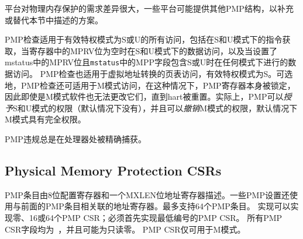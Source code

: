 {\iffalse
\begin{commentary}
Platforms vary widely in demands for physical memory protection, and
some platforms may provide other PMP structures in addition to or
instead of the scheme described in this section.
\end{commentary}
\fi
\begin{commentary}
平台对物理内存保护的需求差异很大，一些平台可能提供其他PMP结构，以补充或替代本节中描述的方案。
\end{commentary}

\iffalse
PMP checks are applied to all accesses whose effective privilege mode is S or
U, including instruction fetches in S and U mode, data accesses in S and
U mode when the MPRV bit in the {\tt mstatus} register is clear, and data
accesses in any mode when the MPRV bit in {\tt mstatus} is set and the MPP
field in {\tt mstatus} contains S or U.
PMP checks are also applied to page-table
accesses for virtual-address translation, for which the effective
privilege mode is S.  Optionally, PMP checks may additionally apply
to M-mode accesses, in which case the PMP registers themselves are
locked, so that even M-mode software cannot change them until the hart is
reset.  In effect, PMP can {\em grant} permissions to S and U
modes, which by default have none, and can {\em revoke} permissions
from M-mode, which by default has full permissions.

PMP violations are always trapped precisely at the processor.
\fi
PMP检查适用于有效特权模式为S或U的所有访问，包括在S和U模式下的指令获取，当寄存器中的MPRV位为空时在S和U模式下的数据访问，以及当设置了mstatus中的MPRV位且{\tt mstatus}中的MPP字段包含S或U时在任何模式下进行的数据访问。
PMP检查也适用于虚拟地址转换的页表访问，有效特权模式为S。可选地，PMP检查还可适用于M模式访问，在这种情况下，PMP寄存器本身被锁定，因此即使是M模式软件也无法更改它们，直到hart被重置。实际上，PMP可以{\em 授予}S和U模式的权限（默认情况下没有），并且可以{\em 撤销}M模式的权限，默认情况下M模式具有完全权限。

PMP违规总是在处理器处被精确捕获。

\subsection{Physical Memory Protection CSRs}

\iffalse
PMP entries are described by an 8-bit configuration register and one MXLEN-bit
address register.  Some PMP settings additionally use the address register
associated with the preceding PMP entry.
Up to 64 PMP entries are supported.
Implementations may implement zero, 16, or 64 PMP CSRs; the lowest-numbered
PMP CSRs must be implemented first.
All PMP CSR fields are \warl\ and may be read-only zero.
PMP CSRs are only accessible to M-mode.
\fi
PMP条目由8位配置寄存器和一个MXLEN位地址寄存器描述。一些PMP设置还使用与前面的PMP条目相关联的地址寄存器。最多支持64个PMP条目。
实现可以实现零、16或64个PMP CSR；必须首先实现最低编号的PMP CSR。
所有PMP CSR字段均为\warl\ ，并且可能为只读零。
PMP CSR仅可用于M模式。

}
